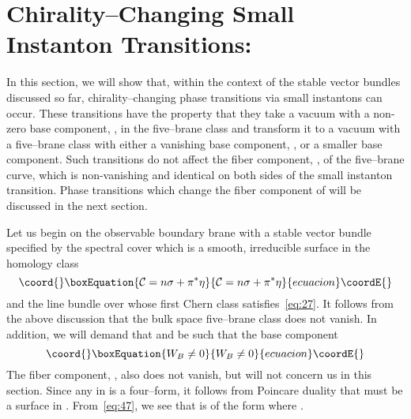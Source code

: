 \documentclass[a4paper,12pt]{article}
\numberwithin{equation}{section}
\def\cC{{\mathcal C}}
\def\cN{{\mathcal N}}
\theoremstyle{plain}
\begin{document}

\section{Chirality--Changing Small Instanton Transitions:}
\label{sec-chirality}


In this section, we will show that, within the 
context of the stable \coordHE{} vector bundles discussed so far, 
chirality--changing phase transitions via small
instantons can occur. These transitions have the property that they 
take a vacuum with a non-zero base
component, \coordHE{}, in the five--brane class and transform it to a
vacuum with a five--brane class with either a vanishing base component,
\coordHE{}, or a smaller base component.
Such transitions do not affect the fiber component, \coordHE{}, of the
five--brane curve, which is non-vanishing and identical on both sides of the
small instanton transition. Phase transitions which change the fiber component
of \coordHE{} will be discussed in the next section.

Let us begin on the observable boundary brane 
with a stable  \coordHE{} vector bundle \coordHE{} specified by the
spectral cover \myHighlight{$\cC$}\coordHE{} which is a smooth, irreducible surface in the
homology class 
\begin{equation}\coord{}\boxEquation{
{\cal{C}}=n\sigma + \pi^{*}\eta
\label{eq:56}
}{
{\cal{C}}=n\sigma + \pi^{*}\eta
}{ecuacion}\coordE{}\end{equation}
and the line bundle \myHighlight{$\cN$}\coordHE{} over \coordHE{} whose first Chern class
satisfies~\eqref{eq:27}. It follows from the above discussion that the bulk
space five--brane class \coordHE{} does not vanish. 
In addition, we will demand that \coordHE{} and \coordHE{} be such that the base component
\begin{equation}\coord{}\boxEquation{
W_{B} \neq 0
\label{eq:57}
}{
W_{B} \neq 0
}{ecuacion}\coordE{}\end{equation}
The fiber component, \coordHE{}, also does not vanish, but will not concern us in
this section. Since any \coordHE{} in \coordHE{} is a four--form, it follows from Poincare
duality that \coordHE{} must be a surface in \coordHE{}. From~\eqref{eq:47}, we see that 
\coordHE{} is of the form \coordHE{} where \coordHE{}. 
\end{document}
